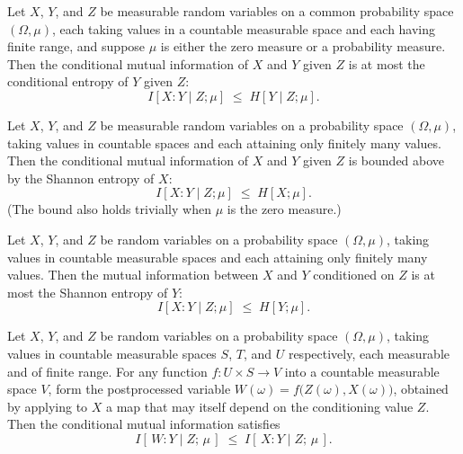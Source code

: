 \begin{theorem}
\label{ProbabilityTheory.condMutualInfo_le_condEntropy_right}
\leanok
{}
Let $X$, $Y$, and $Z$ be measurable random variables on a common probability space
$(\Omega, \mu)$, each taking values in a countable measurable space and each having
finite range, and suppose $\mu$ is either the zero measure or a probability measure.
Then the conditional mutual information of $X$ and $Y$ given $Z$ is at most the
conditional entropy of $Y$ given $Z$:
\[
  I[X : Y \mid Z ; \mu] \;\le\; H[Y \mid Z ; \mu].
\]
\end{theorem}

\begin{theorem}
\label{ProbabilityTheory.condMutualInfo_le_entropy_left}
\leanok
{}
Let $X$, $Y$, and $Z$ be measurable random variables on a probability space $(\Omega,
\mu)$, taking values in countable spaces and each attaining only finitely many values.
Then the conditional mutual information of $X$ and $Y$ given $Z$ is bounded above by the
Shannon entropy of $X$:
\[
  I[X : Y \mid Z ; \mu] \;\le\; H[X ; \mu].
\]
(The bound also holds trivially when $\mu$ is the zero measure.)
\end{theorem}

\begin{theorem}
\label{ProbabilityTheory.condMutualInfo_le_entropy_right}
\leanok
{}
Let $X$, $Y$, and $Z$ be random variables on a probability space $(\Omega, \mu)$, taking
values in countable measurable spaces and each attaining only finitely many values. Then
the mutual information between $X$ and $Y$ conditioned on $Z$ is at most the Shannon
entropy of $Y$:
\[
  I[X : Y \mid Z; \mu] \;\le\; H[Y; \mu].
\]
\end{theorem}

\begin{theorem}
\label{ProbabilityTheory.condMutualInfo_comp_left_le_of_comp_conditioning}
\leanok
{}
Let $X$, $Y$, and $Z$ be random variables on a probability space $(\Omega, \mu)$, taking
values in countable measurable spaces $S$, $T$, and $U$ respectively, each measurable
and of finite range. For any function $f \colon U \times S \to V$ into a countable
measurable space $V$, form the postprocessed variable $W(\omega) = f\bigl(Z(\omega),
X(\omega)\bigr)$, obtained by applying to $X$ a map that may itself depend on the
conditioning value $Z$. Then the conditional mutual information satisfies
\[
  I[\,W : Y \mid Z;\, \mu\,] \;\le\; I[\,X : Y \mid Z;\, \mu\,].
\]
\end{theorem}

